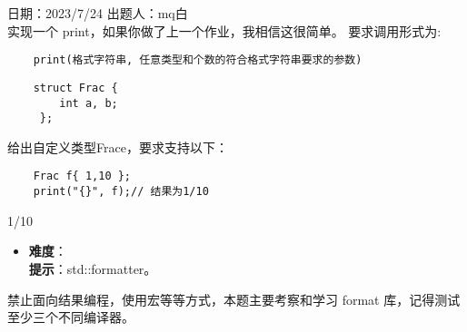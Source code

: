 日期：2023/7/24 出题人：mq白\\

实现一个 print，如果你做了上一个作业，我相信这很简单。 要求调用形式为:

\begin{verbatim}
    print(格式字符串, 任意类型和个数的符合格式字符串要求的参数)
\end{verbatim}

\begin{verbatim}
    struct Frac {
        int a, b;
     };
\end{verbatim}

给出自定义类型Frace，要求支持以下：

\begin{verbatim}
    Frac f{ 1,10 };
    print("{}", f);// 结果为1/10
\end{verbatim}

\begin{tcolorbox}[title = {要求运行结果},
    fonttitle = \bfseries, fontupper = \sffamily, fontlower = \itshape]
    1/10
\end{tcolorbox}

\begin{itemize}
    \item \textbf{难度}：  \\
    \textbf{提示}：std::formatter。
\end{itemize}

禁止面向结果编程，使用宏等等方式，本题主要考察和学习 format 库，记得测试至少三个不同编译器。

